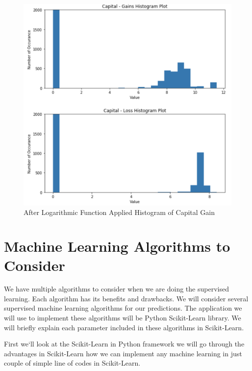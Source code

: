\documentclass[sigconf]{acmart}
\begin{document}
 \begin{figure}[!ht]
  \centering
      \includegraphics[width=\columnwidth]{project/images/logarithmic-applied.png}
  \caption{After Logarithmic Function Applied Histogram of Capital Gain \cite{Borga2017}}\label{fig:Hist-capital-log}
\end{figure}

 


\section{Machine Learning Algorithms to Consider}
We have multiple algorithms to consider when we are doing the supervised learning. Each algorithm has its benefits and drawbacks. We will consider several supervised machine learning algorithms for our predictions. The application we will use to implement these algorithms will be Python Scikit-Learn library. We will briefly explain each parameter included in these algorithms in Scikit-Learn.

\par First we`ll look at the Scikit-Learn in Python framework we will go through the advantages in Scikit-Learn how we can implement any machine learning in just couple of simple line of codes in Scikit-Learn. 
\end{document}
